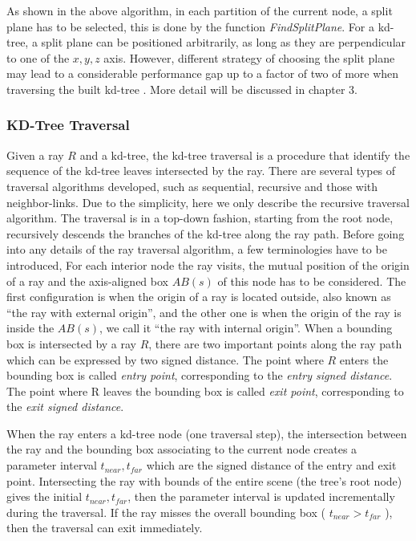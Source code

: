 As shown in the above algorithm, in each partition of the current node, a split plane has to be selected, this is done by the function \emph{FindSplitPlane}. For a kd-tree, a split plane can be positioned arbitrarily, as long as they are perpendicular to one of the \( {x, y, z} \) axis. However, different strategy of choosing the split plane may lead to a considerable performance gap up to a factor of two of more when traversing the built kd-tree \cite{havran200}. More detail will be discussed in chapter 3. 

\subsubsection{KD-Tree Traversal}
\label{subsubsec:kd-tree_traversal}

Given a ray \(R\) and a kd-tree, the kd-tree traversal is a procedure that identify the sequence of the kd-tree leaves intersected by the ray. There are several types of traversal algorithms developed, such as sequential, recursive and those with neighbor-links. Due to the simplicity, here we only describe the recursive traversal algorithm. The traversal is in a top-down fashion, starting from the root node, recursively descends the branches of the kd-tree along the ray path. Before going into any details of the ray traversal algorithm, a few terminologies have to be introduced, For each interior node the ray visits, the mutual position of the origin of a ray and the axis-aligned box \( AB(s) \) of this node has to be considered. The first configuration is when the origin of a ray is located outside, also known as ``the ray with external origin'', and the other one is when the origin of the ray is inside the \( AB(s) \), we call it ``the ray with internal origin''. When a bounding box is intersected by a ray \( R \), there are two important points along the ray path which can be expressed by two signed distance. The point where \( R \) enters the bounding box is called \emph{entry point}, corresponding to the \emph{entry signed distance}. The point where R leaves the bounding box is called \emph{exit point}, corresponding to the \emph{exit signed distance}. 

When the ray enters a kd-tree node (one traversal step), the intersection between the ray and the bounding box associating to the current node creates a parameter interval \( t_{near}, t_{far} \) which are the signed distance of the entry and exit point. Intersecting the ray with bounds of the entire scene (the tree's root node) gives the initial \( t_{near}, t_{far} \), then the parameter interval is updated incrementally during the traversal. If the ray misses the overall bounding box ( \( t_{near} > t_{far} \) ), then the traversal can exit immediately. 


